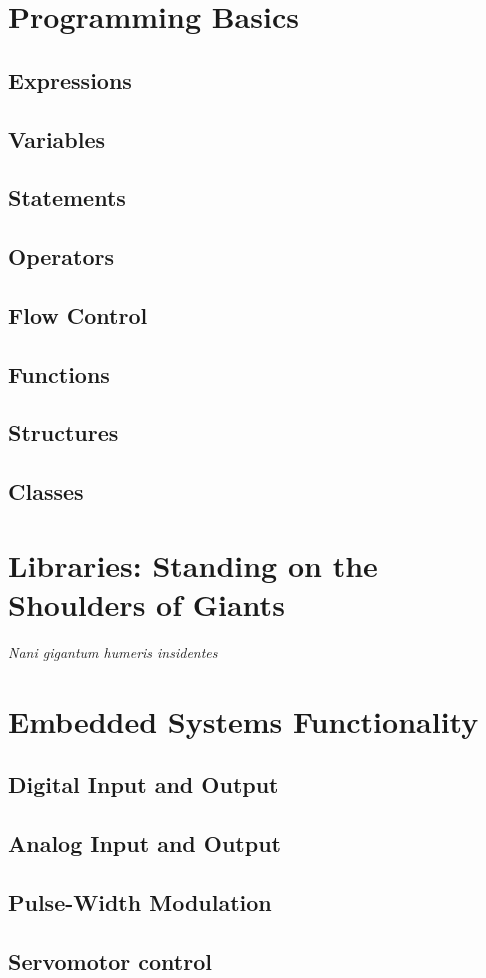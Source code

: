 \documentclass[letterpaper, 11pt]{memoir}
\begin{document}



\chapter{Programming Basics}
\section{Expressions}
\section{Variables}
\section{Statements}
\section{Operators}
\section{Flow Control}
\section{Functions}
\section{Structures}
\section{Classes}

\chapter{Libraries: Standing on the Shoulders of Giants}
\emph{Nani gigantum humeris insidentes}

\chapter{Embedded Systems Functionality}
\section{Digital Input and Output}
\section{Analog Input and Output}
\section{Pulse-Width Modulation}
\section{Servomotor control}

\printbibliography
\end{document}
